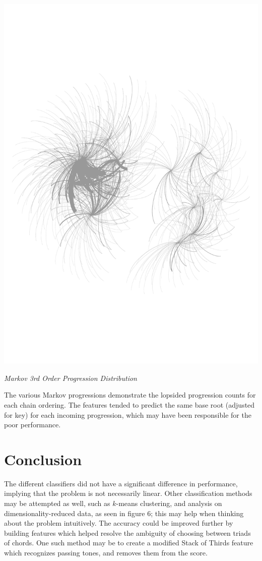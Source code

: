 \documentclass[12pt]{article}
\begin{document}
\newpage
\begin{center}
\includegraphics[trim = 0 100 0 100, scale=.5]{markov4.pdf}
\end{center}
\begin{center}\emph{Markov 3rd Order Progression Distribution}\\ \end{center}

The various Markov progressions demonstrate the lopsided progression counts for each chain ordering. The features tended to predict the same base root (adjusted for key) for each incoming progression, which may have been responsible for the poor performance. 

\section{Conclusion}
The different classifiers did not have a significant difference in performance, implying that the problem is not necessarily linear. Other classification methods may be attempted as well, such as $k$-means clustering, and analysis on dimensionality-reduced data, as seen in figure 6; this may help when thinking about the problem intuitively. The accuracy could be improved further by building features which helped resolve the ambiguity of choosing between triads of chords. One such method may be to create a modified Stack of Thirds feature which recognizes passing tones, and removes them from the score.  
\end{document}
